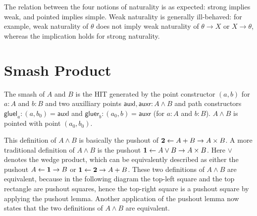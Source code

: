 \documentclass{article}
\renewcommand{\smash}{\wedge}
\newcommand{\auxl}{\mathsf{auxl}}
\newcommand{\auxr}{\mathsf{auxr}}
\newcommand{\gluel}{\mathsf{gluel}}
\newcommand{\gluer}{\mathsf{gluer}}
\begin{document}
\begin{rmk}
	The relation between the four notions of naturality is as expected: strong implies weak, and pointed implies simple. Weak naturality is generally ill-behaved: for example, weak naturality of $\theta$ does not imply weak naturality of $\theta \to X$ or $X \to \theta$, whereas the implication holds for strong naturality.
\end{rmk}

\section{Smash Product}

\begin{defn}
  The smash of $A$ and $B$ is the HIT generated by the point constructor $(a,b)$ for $a:A$ and $b:B$
  and two auxilliary points $\auxl,\auxr:A\smash B$ and path constructors $\gluel_a:(a,b_0)=\auxl$
  and $\gluer_b:(a_0,b)=\auxr$ (for $a:A$ and $b:B$). $A\smash B$ is pointed with point $(a_0,b_0)$.
\end{defn}
\begin{rmk}
\item This definition of $A\smash B$ is basically the pushout of
  $\mathbf{2}\leftarrow A+B\to A \times B$.  A more traditional definition of $A\smash B$ is the pushout
  $\mathbf{1}\leftarrow A\vee B\to A \times B$. Here $\vee$ denotes the wedge product, which can be
  equivalently described as either the pushout $A\leftarrow \mathbf{1}\to B$ or
  $\mathbf{1}\leftarrow \mathbf{2}\to A + B$. These two definitions of $A\smash B$ are equivalent, because in
  the following diagram the top-left square and the top rectangle are pushout squares, hence the
  top-right square is a pushout square by applying the pushout lemma. Another application of the
  pushout lemma now states that the two definitions of $A\smash B$ are equivalent.
\begin{center}
\end{center}

\end{rmk}
\end{document}
